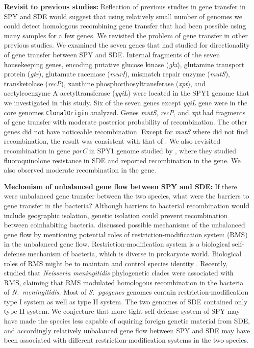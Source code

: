 \documentclass[english]{article}
\begin{document}
\textbf{Revisit to previous studies:} 
Reflection of previous studies in gene transfer in SPY and SDE would suggest
that using relatively small number of genomes we could detect homologous
recombining gene transfer that had been possible using many samples for a few
genes. We revisited the problem of gene transfer in other previous studies.  We
examined the seven genes that \citet{Kalia2001} had studied for directionality
of gene transfer between SPY and SDE. Internal fragments of the seven
housekeeping genes, encoding putative glucose kinase (\textit{gki}), glutamine
transport protein (\textit{gtr}), glutamate racemase (\textit{murI}), mismatch
repair enzyme (\textit{mutS}), transketolase (\textit{recP}), xanthine
phosphoribosyltransferase (\textit{xpt}), and acetylcoenzyme A acetyltransferase
(\textit{yqiL}) were located in the SPY1 genome that we investigated in this
study.  Six of the seven genes except \textit{yqiL }gene were in the core
genomes \texttt{ClonalOrigin} analyzed. Genes \textit{mutS}, \textit{recP}, and
\textit{xpt} had fragments of gene transfer with moderate posterior probability
of recombination. The other genes did not have noticeable recombination. Except
for \textit{mutS} where \citet{Kalia2001} did not find recombination, the result
was consistent with that of \citet{Kalia2001}.  We also revisited recombination
in gene \textit{parC} in SPY1 genome studied by \citet{Pinho2010}, where they
studied fluoroquinolone resistance in SDE and reported recombination in the
gene. We also observed moderate recombination in the gene. 

\textbf{Mechanism of unbalanced gene flow between SPY and SDE:} 
If there were unbalanced gene transfer between the two species, what were the
barriers \citep{Thomas2005} to gene transfer in the bacteria? Although barriers
to bacterial recombination would include geographic isolation, genetic isolation
could prevent recombination between coinhabiting bacteria. \citet{Kalia2001}
discussed possible mechanisms of the unbalanced gene flow by mentioning
potential roles of restriction-modification system (RMS) in the unbalanced gene
flow.  Restriction-modification system is a biological self-defense mechanism of
bacteria, which is diverse in prokaryote world. Biological roles of RMS might be
to maintain and control species identity \citep{Jeltsch2003}.  Recently,
\citet{Budroni2011a} studied that \textit{Neisseria meningitidis} phylogenetic
clades were associated with RMS, claiming that RMS modulated homologous
recombination in the bacteria of \textit{N.\ meningitidis}.  Most of \textit{S.\
pyogenes} genomes contain restriction-modification type I system as well as type
II system. The two genomes of SDE contained only type II system. We conjecture
that more tight self-defense system of SPY may have made the species less
capable of aquiring foreign genetic material from SDE, and accordingly
relatively unbalanced gene flow between SPY and SDE may have been associated
with different restriction-modification systems in the two species.
\end{document}
